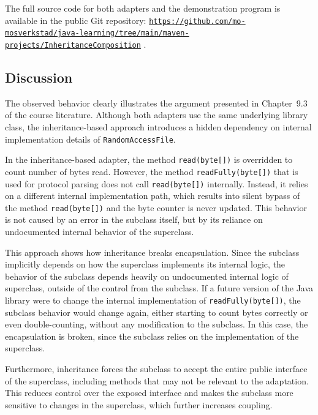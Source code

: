 \documentclass[a4paper]{scrartcl}
\begin{document}
The full source code for both adapters and the demonstration program is available in the public Git repository: \href{https://github.com/mo-mosverkstad/java-learning/tree/main/maven-projects/InheritanceComposition}{\nolinkurl{https://github.com/mo-mosverkstad/java-learning/tree/main/maven-projects/InheritanceComposition}} \cite{sourcecode2}.

\subsection{Discussion}

The observed behavior clearly illustrates the argument presented in Chapter~9.3 of the course literature. Although both adapters use the same underlying library class, the inheritance-based approach introduces a hidden dependency on internal implementation details of \texttt{RandomAccessFile}.

In the inheritance-based adapter, the method \texttt{read(byte[])} is overridden to count number of bytes read. However, the method \texttt{readFully(byte[])} that is used for protocol parsing does not call \texttt{read(byte[])} internally. Instead, it relies on a different internal implementation path, which results into silent bypass of the method \texttt{read(byte[])} and the byte counter is never updated. This behavior is not caused by an error in the subclass itself, but by its reliance on undocumented internal behavior of the superclass.

This approach shows how inheritance breaks encapsulation. Since the subclass implicitly depends on how the superclass implements its internal logic, the behavior of the subclass depends heavily on undocumented internal logic of superclass, outside of the control from the subclass. If a future version of the Java library were to change the internal implementation of \texttt{readFully(byte[])}, the subclass behavior would change again, either starting to count bytes correctly or even double-counting, without any modification to the subclass. In this case, the encapsulation is broken, since the subclass relies on the implementation of the superclass.

Furthermore, inheritance forces the subclass to accept the entire public interface of the superclass, including methods that may not be relevant to the adaptation. This reduces control over the exposed interface and makes the subclass more sensitive to changes in the superclass, which further increases coupling.
\end{document}
